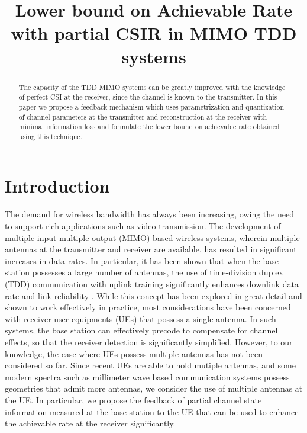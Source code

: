 \documentclass[conference]{IEEEtran}
\title{\LARGE \bf
Lower bound on Achievable Rate with partial CSIR in MIMO TDD systems
}
\begin{document}
\maketitle
\thispagestyle{empty}
\pagestyle{empty}

\begin{abstract}
The capacity of the TDD MIMO systems can be greatly improved with the knowledge of perfect CSI at the receiver, since the channel is known to the transmitter. In this paper we propose a feedback mechanism which uses parametrization and quantization of channel parameters at the transmitter and reconstruction at the receiver with minimal information loss and formulate the lower bound on achievable rate obtained using this technique.

\end{abstract}


\section{Introduction}
The demand for wireless bandwidth has always been increasing, owing
the need to support rich applications such as video
transmission. The development of multiple-input multiple-output (MIMO)
based wireless systems, wherein multiple antennas at the transmitter
and receiver are available, has resulted in significant increases in
data rates. In particular, it has been shown that when the base
station possesses a large number of antennas, the use of time-division
duplex (TDD) communication with uplink training significantly enhances
downlink data rate and link reliability
\cite{larsson2014massive}. While this concept has been explored in
great detail and shown to work effectively in practice, most
considerations have been concerned with receiver user equipments (UEs)
that possess a single antenna. In such systems, the base station can
effectively precode to compensate for channel effects, so that the
receiver detection is significantly simplified. However, to our
knowledge, the case where UEs possess multiple antennas has not been
considered so far. Since recent UEs are able to hold mutiple antennas,
and some modern spectra such as millimeter wave based communication
systems possess geometries that admit more antennas, we consider the
use of multiple antennas at the UE. In particular, we propose the
feedback of partial channel state information measured at the base
station to the UE that can be used to enhance the achievable rate at
the receiver significantly.
\end{document}
